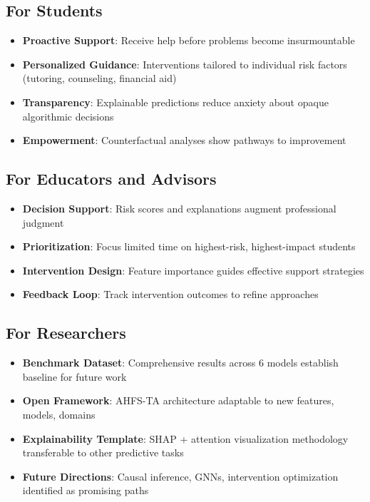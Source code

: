 \subsection{For Students}

\begin{itemize}
\item \textbf{Proactive Support}: Receive help before problems become insurmountable
\item \textbf{Personalized Guidance}: Interventions tailored to individual risk factors (tutoring, counseling, financial aid)
\item \textbf{Transparency}: Explainable predictions reduce anxiety about opaque algorithmic decisions
\item \textbf{Empowerment}: Counterfactual analyses show pathways to improvement
\end{itemize}

\subsection{For Educators and Advisors}

\begin{itemize}
\item \textbf{Decision Support}: Risk scores and explanations augment professional judgment
\item \textbf{Prioritization}: Focus limited time on highest-risk, highest-impact students
\item \textbf{Intervention Design}: Feature importance guides effective support strategies
\item \textbf{Feedback Loop}: Track intervention outcomes to refine approaches
\end{itemize}

\subsection{For Researchers}

\begin{itemize}
\item \textbf{Benchmark Dataset}: Comprehensive results across 6 models establish baseline for future work
\item \textbf{Open Framework}: AHFS-TA architecture adaptable to new features, models, domains
\item \textbf{Explainability Template}: SHAP + attention visualization methodology transferable to other predictive tasks
\item \textbf{Future Directions}: Causal inference, GNNs, intervention optimization identified as promising paths
\end{itemize}


